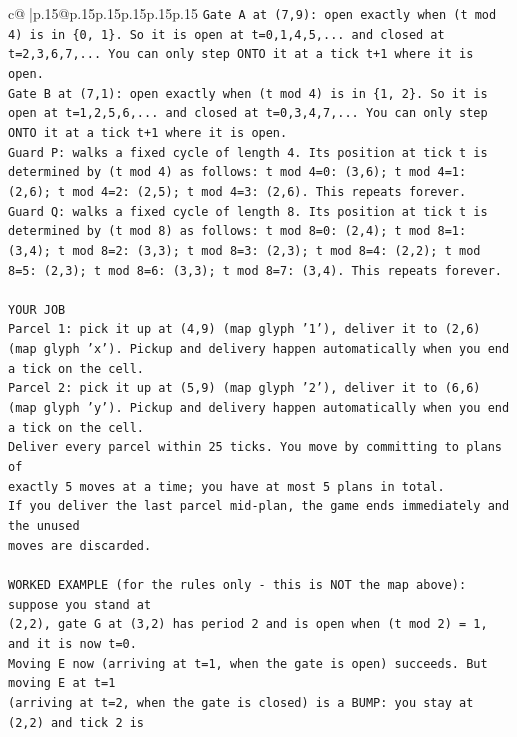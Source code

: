 \documentclass{article}
\begin{document}
{\begin{supertabular}{c@{$\;$}|p{.15\linewidth}@{}p{.15\linewidth}p{.15\linewidth}p{.15\linewidth}p{.15\linewidth}p{.15\linewidth}}
{{{\texttt{Gate A at (7,9): open exactly when (t mod 4) is in \{0, 1\}. So it is open at t=0,1,4,5,... and closed at t=2,3,6,7,... You can only step ONTO it at a tick t+1 where it is open.} \\
\texttt{Gate B at (7,1): open exactly when (t mod 4) is in \{1, 2\}. So it is open at t=1,2,5,6,... and closed at t=0,3,4,7,... You can only step ONTO it at a tick t+1 where it is open.} \\
\texttt{Guard P: walks a fixed cycle of length 4. Its position at tick t is determined by (t mod 4) as follows: t mod 4=0: (3,6); t mod 4=1: (2,6); t mod 4=2: (2,5); t mod 4=3: (2,6). This repeats forever.} \\
\texttt{Guard Q: walks a fixed cycle of length 8. Its position at tick t is determined by (t mod 8) as follows: t mod 8=0: (2,4); t mod 8=1: (3,4); t mod 8=2: (3,3); t mod 8=3: (2,3); t mod 8=4: (2,2); t mod 8=5: (2,3); t mod 8=6: (3,3); t mod 8=7: (3,4). This repeats forever.} \\
\\ 
\texttt{YOUR JOB} \\
\texttt{Parcel 1: pick it up at (4,9) (map glyph '1'), deliver it to (2,6) (map glyph 'x'). Pickup and delivery happen automatically when you end a tick on the cell.} \\
\texttt{Parcel 2: pick it up at (5,9) (map glyph '2'), deliver it to (6,6) (map glyph 'y'). Pickup and delivery happen automatically when you end a tick on the cell.} \\
\texttt{Deliver every parcel within 25 ticks. You move by committing to plans of} \\
\texttt{exactly 5 moves at a time; you have at most 5 plans in total.} \\
\texttt{If you deliver the last parcel mid{-}plan, the game ends immediately and the unused} \\
\texttt{moves are discarded.} \\
\\ 
\texttt{WORKED EXAMPLE (for the rules only {-} this is NOT the map above): suppose you stand at} \\
\texttt{(2,2), gate G at (3,2) has period 2 and is open when (t mod 2) = 1, and it is now t=0.} \\
\texttt{Moving E now (arriving at t=1, when the gate is open) succeeds. But moving E at t=1} \\
\texttt{(arriving at t=2, when the gate is closed) is a BUMP: you stay at (2,2) and tick 2 is} \\
}}}
\end{supertabular}}
\end{document}
